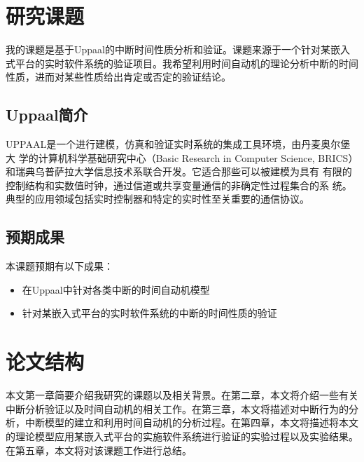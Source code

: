 \section{研究课题}
\label{sec:subject}
我的课题是基于Uppaal的中断时间性质分析和验证。课题来源于一个针对某嵌入
式平台的实时软件系统的验证项目。我希望利用时间自动机的理论分析中断的时间
性质，进而对某些性质给出肯定或否定的验证结论。

\subsection{Uppaal简介}
\label{subsec:Uppaal_intro}
UPPAAL是一个进行建模，仿真和验证实时系统的集成工具环境，由丹麦奥尔堡大
学的计算机科学基础研究中心（Basic Research in Computer Science, BRICS）和瑞典乌普萨拉大学信息技术系联合开发。它适合那些可以被建模为具有
有限的控制结构和实数值时钟，通过信道或共享变量通信的非确定性过程集合的系
统。典型的应用领域包括实时控制器和特定的实时性至关重要的通信协议。

\subsection{预期成果}
\label{subsec:expectation}
本课题预期有以下成果：
\begin{itemize}
	\item 在Uppaal中针对各类中断的时间自动机模型
	\item 针对某嵌入式平台的实时软件系统的中断的时间性质的验证
\end{itemize}

\section{论文结构}
\label{sec:structure}
本文第一章简要介绍我研究的课题以及相关背景。在第二章，本文将介绍一些有关
中断分析验证以及时间自动机的相关工作。在第三章，本文将描述对中断行为的分
析，中断模型的建立和利用时间自动机的分析过程。在第四章，本文将描述将本文
的理论模型应用某嵌入式平台的实施软件系统进行验证的实验过程以及实验结果。
在第五章，本文将对该课题工作进行总结。


